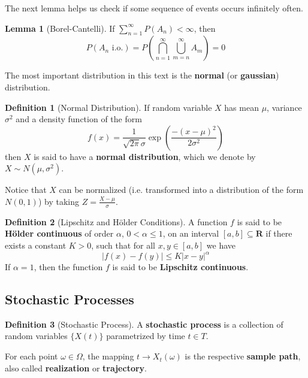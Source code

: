 \documentclass[12pt,a4paper]{article}
\theoremstyle{definition}
\newtheorem{lemma}[theorem]{Lemma}
\newtheorem{definition}{Definition}[section]
\begin{document}
The next lemma helps us check if some sequence of events occurs infinitely often.

\begin{lemma}[Borel-Cantelli]
	If $\sum_{n=1}^\infty P(A_n) < \infty$, then
	\[
		P(A_n \text{ i.o.}) = P \left( \bigcap_{n=1}^\infty \bigcup_{m=n}^\infty A_m \right) = 0
	\]
\end{lemma}


The most important distribution in this text is the \textbf{normal} (or \textbf{gaussian}) distribution.
 
\begin{definition}[Normal Distribution]
	If random variable $X$ has mean $\mu$, variance $\sigma^2$ and a density function of the form
	\[
		f(x) = \frac{1}{\sqrt{2\pi} \sigma} \exp \left( \frac{-(x-\mu)^2}{2\sigma^2} \right) 
	\]
	then $X$ is said to have a \textbf{normal distribution}, which we denote by $X \sim N(\mu, \sigma^2)$.
\end{definition}

Notice that $X$ can be normalized (i.e. transformed into a distribution of the form $N(0,1)$) by taking $Z = \frac{X-\mu}{\sigma}$.


\begin{definition}[Lipschitz and H\"older Conditions]
	A function $f$ is said to be \textbf{H\"older continuous} of order $\alpha$, $0 < \alpha \leq 1$, on an interval $[a,b] \subseteq \textbf{R}$ if there exists a constant $K > 0$, such that for all $x,y \in [a,b]$ we have
	\[
		|f(x) - f(y)| \leq K |x-y|^{\alpha}
	\]
	If $\alpha = 1$, then the function $f$ is said to be \textbf{Lipschitz continuous}.
\end{definition}

\subsection{Stochastic Processes}

\begin{definition}[Stochastic Process]
	A \textbf{stochastic process} is a collection of random variables $\{ X(t) \}$ parametrized by time $t \in T$.  
	
	For each point $\omega \in \Omega$, the mapping $t \longrightarrow X_t(\omega)$ is the respective \textbf{sample path}, also called \textbf{realization} or \textbf{trajectory}.
\end{definition}
\end{document}
